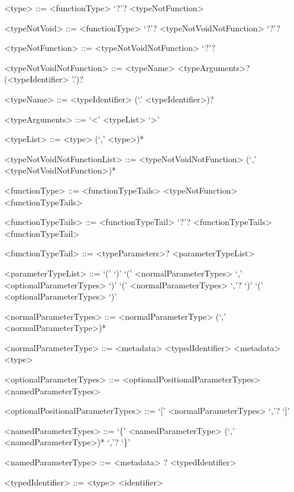 \documentclass[makeidx]{article}
\begin{document}


\begin{grammar}

<type> ::= <functionType> `?'?
  \alt <typeNotFunction>

<typeNotVoid> ::= <functionType> `?'?
  \alt <typeNotVoidNotFunction> `?'?

<typeNotFunction> ::= \VOID{}
  \alt <typeNotVoidNotFunction> `?'?

<typeNotVoidNotFunction> ::= <typeName> <typeArguments>?
  \alt (<typeIdentifier> '.')? \FUNCTION{}

<typeName> ::= <typeIdentifier> (`.' <typeIdentifier>)?

<typeArguments> ::= `<' <typeList> `>'

<typeList> ::= <type> (`,' <type>)*

<typeNotVoidNotFunctionList> ::= \gnewline{}
  <typeNotVoidNotFunction> (`,' <typeNotVoidNotFunction>)*

<functionType> ::= <functionTypeTails>
  \alt <typeNotFunction> <functionTypeTails>

<functionTypeTails> ::= <functionTypeTail> `?'? <functionTypeTails>
  \alt <functionTypeTail>

<functionTypeTail> ::= \FUNCTION{} <typeParameters>? <parameterTypeList>

<parameterTypeList> ::= `(' `)'
  \alt `(' <normalParameterTypes> `,' <optionalParameterTypes> `)'
  \alt `(' <normalParameterTypes> `,'? `)'
  \alt `(' <optionalParameterTypes> `)'

<normalParameterTypes> ::= \gnewline{}
  <normalParameterType> (`,' <normalParameterType>)*

<normalParameterType> ::= <metadata> <typedIdentifier>
  \alt <metadata> <type>

<optionalParameterTypes> ::= <optionalPositionalParameterTypes>
  \alt <namedParameterTypes>

<optionalPositionalParameterTypes> ::= `[' <normalParameterTypes> `,'? `]'

<namedParameterTypes> ::=
  `\{' <namedParameterType> (`,' <namedParameterType>)* `,'? `\}'

<namedParameterType> ::=
  <metadata> \REQUIRED? <typedIdentifier>

<typedIdentifier> ::= <type> <identifier>
\end{grammar}
\end{document}
